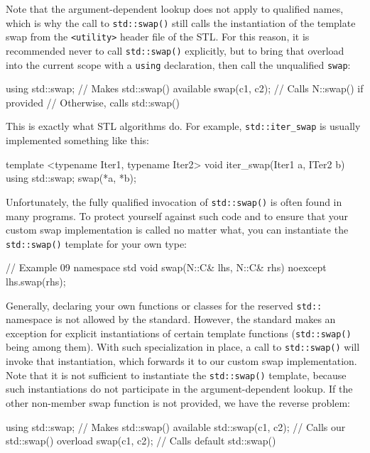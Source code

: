 Note that the argument-dependent lookup does not apply to qualified names, which is why the call to \texttt{std::swap()} still calls the instantiation of the template swap from the \texttt{\textless{}utility\textgreater{}} header file of the STL. For this reason, it is recommended never to call \texttt{std::swap()} explicitly, but to bring that overload into the current scope with a \texttt{using} declaration, then call the unqualified \texttt{swap}:

\begin{code}
using std::swap;    // Makes std::swap() available
swap(c1, c2);    // Calls N::swap() if provided
             // Otherwise, calls std::swap()
\end{code}

This is exactly what STL algorithms do. For example, \texttt{std::iter\_swap} is usually implemented something like this:

\begin{code}
template <typename Iter1, typename Iter2>
void iter_swap(Iter1 a, ITer2 b) {
  using std::swap;
  swap(*a, *b);
}
\end{code}

Unfortunately, the fully qualified invocation of \texttt{std::swap()} is often found in many programs. To protect yourself against such code and to ensure that your custom swap implementation is called no matter what, you can instantiate the \texttt{std::swap()} template for your own type:

\begin{code}
// Example 09
namespace std {
void swap(N::C& lhs, N::C& rhs) noexcept {
  lhs.swap(rhs); }
}
\end{code}

Generally, declaring your own functions or classes for the reserved \texttt{std::} namespace is not allowed by the standard. However, the standard makes an exception for explicit instantiations of certain template functions (\texttt{std::swap()} being among them). With such specialization in place, a call to \texttt{std::swap()} will invoke that instantiation, which forwards it to our custom swap implementation. Note that it is not sufficient to instantiate the \texttt{std::swap()} template, because such instantiations do not participate in the argument-dependent lookup. If the other non-member swap function is not provided, we have the reverse problem:

\begin{code}
using std::swap;        // Makes std::swap() available
std::swap(c1, c2);    // Calls our std::swap() overload
swap(c1, c2);        // Calls default std::swap()
\end{code}

